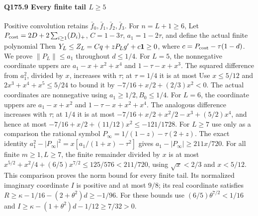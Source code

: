 \paragraph{Q175.9 Every finite tail $L\ge\allowbreak 5$}\label{part:Q175.9}
Positive convolution retains $\bar f_0,\allowbreak \bar f_1,\allowbreak \bar f_2,\allowbreak \bar f_3$.
For $n=\allowbreak L+1\ge\allowbreak 6$,
Let $P_{\rm cost}=\allowbreak 2D+2\sum_{i\ge\allowbreak 1}(D_i)_+$,
$C=\allowbreak 1-3\tau$, $a_1=\allowbreak 1-2\tau$, and define the actual finite polynomial
Then $Y_L\le\allowbreak  Z_L=\allowbreak Cq+zP_Lg'+c\mathbf1\ge\allowbreak 0$, where
$c=\allowbreak P_{\rm cost}-\tau(1-d)$.
We prove $\|P_L\|\le\allowbreak  a_1$ throughout $d\le\allowbreak 1/4$.
For $L=\allowbreak 5$, the nonnegative coordinate uppers are
$a_1-x+x^2+x^4$ and $1-\tau-x+x^3$.
The squared difference from $a_1^2$, divided by $x$, increases with
$\tau$; at $\tau=\allowbreak 1/4$ it is at most
Use $x\le\allowbreak 5/12$ and $2x^3+x^4+x^5\le\allowbreak 5/24$ to bound it by
$-7/16+x/2+(2/3)x^2<\allowbreak 0$.
The actual coordinates are nonnegative using $a_1\ge\allowbreak 1/2,\allowbreak B_0\le\allowbreak 1/4$.
For $L=\allowbreak 6$, the coordinate uppers are
$a_1-x+x^2$ and $1-\tau-x+x^2+x^4$.
The analogous difference increases with $\tau$; at $1/4$ it is at most
$-7/16+x/2+x^2/2-x^3+(5/2)x^4$, and hence at most
$-7/16+x/2+(11/12)x^2\le\allowbreak -121/1728$.
For $L\ge\allowbreak 7$ use only as a comparison the rational symbol
$P_\infty=\allowbreak 1/(1-z)-\tau(2+z)$.
The exact identity
$a_1^2-|P_\infty|^2=\allowbreak x[a_1/(1+x)-\tau^2]$ gives
$a_1-|P_\infty|\ge\allowbreak 211x/720$.
For all finite $m\ge\allowbreak 1,\allowbreak L\ge\allowbreak 7$, the finite remainder divided by $x$ is
at most
$x^{5/2}+x^2/4+(6/5)x^{7/2}\le\allowbreak 125/576<\allowbreak 211/720$,
using $\sqrt x<\allowbreak 2/3$ and $x<\allowbreak 5/12$.
This comparison proves the norm bound for every finite tail.
Its normalized imaginary coordinate $I$ is positive and at most $9/8$;
its real coordinate satisfies
$R\ge\allowbreak \kappa-1/16-(2+\theta^2)d\ge\allowbreak -1/96$.
For these bounds use $(6/5)\theta^{7/2}<\allowbreak 1/16$ and
$I\ge\allowbreak \kappa-(1+\theta^2)d-1/12\ge\allowbreak 7/32>\allowbreak 0$.

